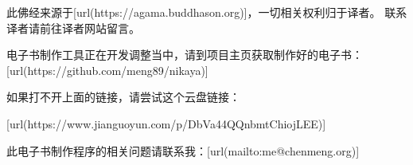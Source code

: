 此佛经来源于[url(https://agama.buddhason.org)]，一切相关权利归于译者。 联系译者请前往译者网站留言。
\blank

电子书制作工具正在开发调整当中，请到项目主页获取制作好的电子书：
[url(https://github.com/meng89/nikaya)]

\blank
如果打不开上面的链接，请尝试这个云盘链接：

[url(https://www.jianguoyun.com/p/DbVa44QQnbmtChiojLEE)]

\blank
此电子书制作程序的相关问题请联系我：[url(mailto:me@chenmeng.org)]